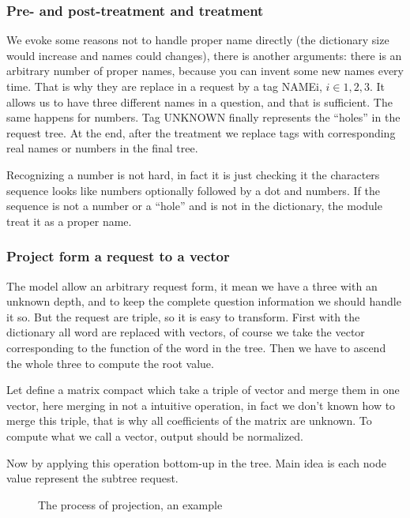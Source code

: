 \subsubsection{Pre- and post-treatment and treatment}

We evoke some reasons not to handle proper name directly (the dictionary size would increase and names could changes), there is another arguments: there is an arbitrary number of proper names, because you can invent some new names every time. That is why they are replace in a request by a tag NAMEi, $i\in{1,2,3}$. It allows us to have three different names in a question, and that is sufficient. The same happens for numbers. Tag UNKNOWN finally represents the ``holes'' in the request tree. At the end, after the treatment we replace tags with corresponding real names or numbers in the final tree.

Recognizing a number is not hard, in fact it is just checking it the characters sequence looks like numbers optionally followed by a dot and numbers. If the sequence is not a number or a ``hole'' and is not in the dictionary, the module treat it as a proper name.

\subsubsection{Project form a request to a vector}

The model allow an arbitrary request form, it mean we have a three with an unknown depth, and to keep the complete question information we should handle it so. But the request are triple, so it is easy to transform. First with the dictionary all word are replaced with vectors, of course we take the vector corresponding to the function of the word in the tree. Then we have to ascend the whole three to compute the root value.

Let define a matrix compact which take a triple of vector and merge them in one vector, here merging in not a intuitive operation, in fact we don't known how to merge this triple, that is why all coefficients of the matrix are unknown. To compute what we call a vector, output should be normalized.

Now by applying this operation bottom-up in the tree. Main idea is each node value represent the subtree request.

\begin{figure}
\begin{center}
\caption{The process of projection, an example}
\end{center}
\end{figure}

